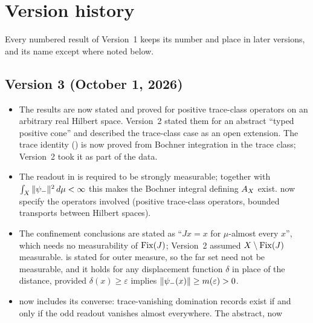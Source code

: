 \section{Version history}
\label{app:version-history}

Every numbered result of Version~1 keeps its number and place in later
versions, and its name except where noted below.

\subsection*{Version 3 (October 1, 2026)}

\begin{itemize}
  \item The results are now stated and proved for positive trace-class
    operators on an arbitrary real Hilbert space.  Version~2 stated
    them for an abstract ``typed positive cone'' and described the
    trace-class case as an open extension.  The trace identity
    () is now proved from
    Bochner integration in the trace class; Version~2 took it as part
    of the data.
  \item The readout in 
    is required to be strongly measurable; together with
    \(\int_X\|\psi_{-}\|^2\,d\mu<\infty\) this makes the Bochner integral
    defining \(A_{X}\) exist.
    now specify the operators involved (positive trace-class operators,
    bounded transports between Hilbert spaces).
  \item The confinement conclusions are stated as ``\(Jx=x\) for
    \(\mu\)-almost every \(x\)'', which needs no measurability of
    \(\operatorname{Fix}(J)\); Version~2 assumed \(X\setminus\operatorname{Fix}(J)\) measurable.
     is stated
    for outer measure, so the far set need not be measurable, and it
    holds for any displacement function \(\delta\) in place of the
    distance, provided \(\delta(x)\geq\varepsilon\) implies
    \(\|\psi_{-}(x)\|\geq m(\varepsilon)>0\).
  \item {} now includes its
    converse: trace-vanishing domination records exist if and only if
    the odd readout vanishes almost everywhere.  The abstract,
     now

\end{itemize}
